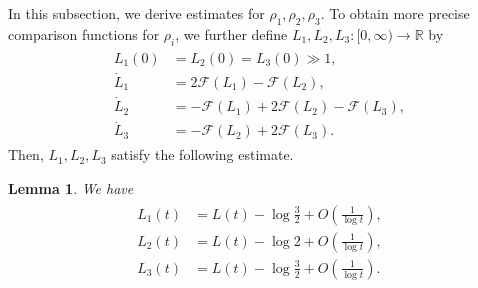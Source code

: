 \documentclass[reqno]{amsart}
\theoremstyle{plain}
\newtheorem{lemma}[theorem]{Lemma}
\theoremstyle{definition}
\numberwithin{equation}{section}
\begin{document}
In this subsection, we derive estimates for $\rho_1,\rho_2,\rho_3$. To obtain more precise comparison functions for $\rho_i$, we further define $L_1,L_2,L_3:[0,\infty)\to\mathbb{R}$ by
\begin{align}\label{L_iode}
\begin{aligned}
L_1(0)&=L_2(0)=L_3(0)\gg 1,
\\
\dot{L}_1&=2\mathcal{F}(L_1)-\mathcal{F}(L_2),
\\
\dot{L}_2&=-\mathcal{F}(L_1)+2\mathcal{F}(L_2)-\mathcal{F}(L_3),
\\
\dot{L}_3&=-\mathcal{F}(L_2)+2\mathcal{F}(L_3).
\end{aligned}
\end{align}
Then, $L_1,L_2,L_3$ satisfy the following estimate.
\begin{lemma}\label{Liasymptotics}
We have
\begin{align}\label{Linagasa}
\begin{aligned}
L_1(t)&=L(t)-\log{\frac{3}{2}}+O\left(\frac{1}{\log{t}}\right),
\\
L_2(t)&=L(t)-\log{2}+O\left(\frac{1}{\log{t}}\right),
\\
L_3(t)&=L(t)-\log{\frac{3}{2}}+O\left(\frac{1}{\log{t}}\right).
\end{aligned}
\end{align}
\end{lemma}
\end{document}
